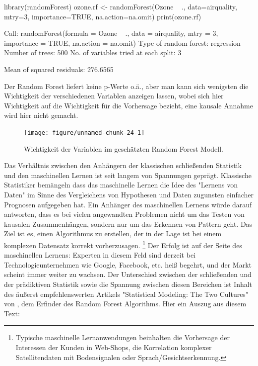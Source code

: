 \documentclass[a4paper,twoside]{tufte-book}\usepackage[]{graphicx}\usepackage[]{color}
\begin{document}
\begin{Schunk}
\begin{Sinput}
library(randomForest)
ozone.rf <- randomForest(Ozone ~ ., data=airquality, mtry=3,
                         importance=TRUE, na.action=na.omit)
print(ozone.rf)
\end{Sinput}
\begin{Soutput}

Call:
 randomForest(formula = Ozone ~ ., data = airquality, mtry = 3,      importance = TRUE, na.action = na.omit) 
               Type of random forest: regression
                     Number of trees: 500
No. of variables tried at each split: 3

          Mean of squared residuals: 276.6565
\end{Soutput}
\end{Schunk}

Der Random Forest liefert keine p-Werte o.ä., aber man kann sich wenigsten die Wichtigkeit der verschiedenen Variablen anzeigen lassen, wobei sich hier Wichtigkeit auf die Wichtigkeit für die Vorhersage bezieht, eine kausale Annahme wird hier nicht gemacht. 


\begin{figure}[htbp]
\begin{center}
\begin{Schunk}

\texttt{[image: figure/unnamed-chunk-24-1]} \end{Schunk}
\caption{Wichtigkeit der Variablen im geschätzten Random Forest Modell.}
\label{fig: Variable Importance Random Forest}
\end{center}
\end{figure}


Das Verhältnis zwischen den Anhängern der klassischen schließenden Statistik und den maschinellen Lernen ist seit langem von Spannungen geprägt. Klassische Statistiker bemängeln dass das maschinelle Lernen die Idee des "Lernens von Daten" im Sinne des Vergleichens von Hypothesen und Daten zugunsten einfacher Prognosen aufgegeben hat. Ein Anhänger des maschinellen Lernens würde darauf antworten, dass es bei vielen angewandten Problemen nicht um das Testen von kausalen Zusammenhängen, sondern nur um das Erkennen von Pattern geht. Das Ziel ist es, einen Algorithmus zu erstellen, der in der Lage ist bei einem komplexen Datensatz korrekt vorherzusagen. \footnote{Typische maschinelle Lernanwendungen beinhalten die Vorhersage der Interessen der Kunden in Web-Shops, die Korrelation komplexer Satellitendaten mit Bodensignalen oder Sprach/Gesichtserkennung.} Der Erfolg ist auf der Seite des maschinellen Lernens: Experten in diesem Feld sind derzeit bei Technologieunternehmen wie Google, Facebook, etc. heiß begehrt, und der Markt scheint immer weiter zu wachsen. Der Unterschied zwischen der schließenden und der prädiktiven Statistik sowie die Spannung zwischen diesen Bereichen ist Inhalt des äußerst empfehlenswerten Artikels "Statistical Modeling: The Two Cultures" von \citet{Breiman-StatisticalModelingTwo-2001}, dem Erfinder des Random Forest Algorithms. Hier ein Auszug aus diesem Text:
\end{document}
